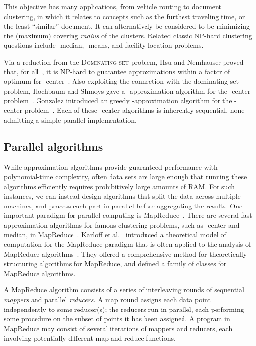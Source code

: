 \documentclass[11pt]{article}
\begin{document}
This objective has many applications, from vehicle routing to document clustering, in which it relates to concepts such as the furthest traveling time, or the least ``similar'' document. 
It can alternatively be considered to be  minimizing the (maximum)
covering \emph{radius} of the clusters.
Related classic NP-hard clustering questions include
-median, -means, and facility location problems.

 Via a reduction from the \textsc{Dominating set} problem, 
 Hsu and Nemhauser proved that, for all~, it is NP-hard to guarantee approximations within a factor  of optimum for -center~\cite{hsu1979easy}. 
Also exploiting the connection with the dominating set problem, Hochbaum and Shmoys gave a -approximation algorithm for the -center problem~\cite{hochbaum1985best}.
Gonzalez introduced an greedy -approximation algorithm for the -center problem~\cite{gonzalez1985clustering}.
Each of these -center algorithms is inherently sequential,
none admitting a simple parallel implementation. 

\subsection{Parallel algorithms}

While approximation algorithms provide guaranteed performance with 
polynomial-time complexity, often data sets are large enough that running
these algorithms efficiently requires prohibitively large amounts of RAM. 
For such instances, we can instead design algorithms that split the data across multiple machines, and process each part in parallel before aggregating the results. 
One important paradigm for parallel computing is
MapReduce~\cite{dean2008mapreduce}. 
There are several fast approximation algorithms for
famous clustering problems, such as -center and -median, in
MapReduce~\cite{blelloch2010parallel,chierichetti2010max,ene2011fast}.
Karloff et al.~\cite{karloff2010model} introduced a theoretical
model of computation for the MapReduce paradigm that is often applied
to the analysis of MapReduce algorithms~\cite{bahmani2012scalable,lattanzi2011filtering}.
They offered a comprehensive method for theoretically structuring algorithms for MapReduce,
and defined a family of classes for MapReduce algorithms.

A MapReduce algorithm consists of a series of interleaving rounds of sequential \emph{mappers} and parallel \emph{reducers}.
A map round assigns each data point independently to some reducer(s);
the reducers run in parallel, each performing some procedure
on the subset of points it has been assigned.
A program in MapReduce may consist of several iterations
of mappers and reducers, each involving potentially different map and reduce functions.
\end{document}
